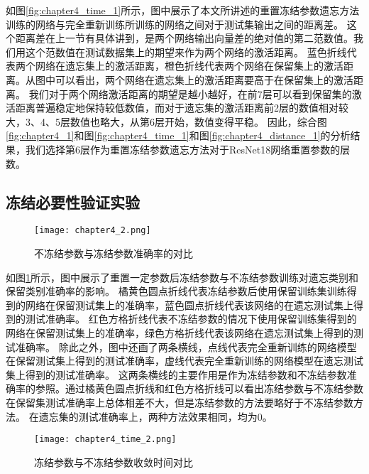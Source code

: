 如图\ref{fig:chapter4_time_1}所示，图中展示了本文所讲述的重置冻结参数遗忘方法训练的网络与完全重新训练所训练的网络之间对于测试集输出之间的距离差。
这个距离差在上一节有具体讲到，是两个网络输出向量差的绝对值的第二范数值。我们用这个范数值在测试数据集上的期望来作为两个网络的激活距离。
蓝色折线代表两个网络在遗忘集上的激活距离，橙色折线代表两个网络在保留集上的激活距离。从图中可以看出，两个网络在遗忘集上的激活距离要高于在保留集上的激活距离。
我们对于两个网络激活距离的期望是越小越好，在前7层可以看到保留集的激活距离普遍稳定地保持较低数值，而对于遗忘集的激活距离前2层的数值相对较大，3、4、5层数值也略大，从第6层开始，数值变得平稳。
因此，综合图\ref{fig:chapter4_1}和图\ref{fig:chapter4_time_1}和图\ref{fig:chapter4_distance_1}的分析结果，我们选择第6层作为重置冻结参数遗忘方法对于ResNet18网络重置参数的层数。
\subsection{冻结必要性验证实验}
\begin{figure}
    \centering
    \texttt{[image: chapter4\_2.png]}
    \caption{不冻结参数与冻结参数准确率的对比}
    \label{fig:chapter4_2}
\end{figure}

如图\ref{fig:chapter4_2}所示，图中展示了重置一定参数后冻结参数与不冻结参数训练对遗忘类别和保留类别准确率的影响。
橘黄色圆点折线代表冻结参数后使用保留训练集训练得到的网络在保留测试集上的准确率，蓝色圆点折线代表该网络的在遗忘测试集上得到的测试准确率。
红色方格折线代表不冻结参数的情况下使用保留训练集得到的网络在保留测试集上的准确率，绿色方格折线代表该网络在遗忘测试集上得到的测试准确率。
除此之外，图中还画了两条横线，点线代表完全重新训练的网络模型在保留测试集上得到的测试准确率，虚线代表完全重新训练的网络模型在遗忘测试集上得到的测试准确率。
这两条横线的主要作用是作为冻结参数和不冻结参数准确率的参照。通过橘黄色圆点折线和红色方格折线可以看出冻结参数与不冻结参数在保留集测试准确率上总体相差不大，但是冻结参数的方法要略好于不冻结参数方法。
在遗忘集的测试准确率上，两种方法效果相同，均为0。
\begin{figure}
    \centering
    \texttt{[image: chapter4\_time\_2.png]}
    \caption{冻结参数与不冻结参数收敛时间对比}
    \label{fig:chapter4_time_2}
\end{figure}

